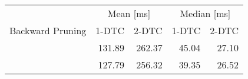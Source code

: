 \begin{tabular}{crrrr}
	\toprule
	                 & \multicolumn{2}{c}{Mean [\si{\milli\second}]} & \multicolumn{2}{c}{Median [\si{\milli\second}]}                 \\
	Backward Pruning & 1-DTC                                         & 2-DTC                                           & 1-DTC & 2-DTC \\
	\midrule
	\xmark           & 131.89                                             & 262.37                                               & 45.04     & 27.10     \\
	\cmark           & 127.79                                             & 256.32                                               & 39.35     & 26.52     \\
	\bottomrule
\end{tabular}
